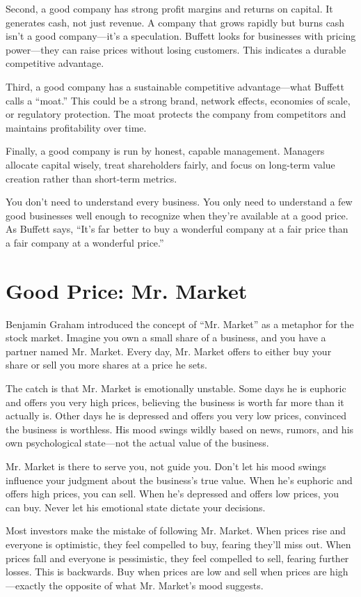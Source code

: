 Second, a good company has strong profit margins and returns on capital. It generates cash, not just revenue. A company that grows rapidly but burns cash isn't a good company—it's a speculation. Buffett looks for businesses with pricing power—they can raise prices without losing customers. This indicates a durable competitive advantage.

Third, a good company has a sustainable competitive advantage—what Buffett calls a ``moat.'' This could be a strong brand, network effects, economies of scale, or regulatory protection. The moat protects the company from competitors and maintains profitability over time.

Finally, a good company is run by honest, capable management. Managers allocate capital wisely, treat shareholders fairly, and focus on long-term value creation rather than short-term metrics.

You don't need to understand every business. You only need to understand a few good businesses well enough to recognize when they're available at a good price. As Buffett says, ``It's far better to buy a wonderful company at a fair price than a fair company at a wonderful price.''

\section*{Good Price: Mr. Market}

Benjamin Graham introduced the concept of ``Mr. Market'' as a metaphor for the stock market. Imagine you own a small share of a business, and you have a partner named Mr. Market. Every day, Mr. Market offers to either buy your share or sell you more shares at a price he sets.

The catch is that Mr. Market is emotionally unstable. Some days he is euphoric and offers you very high prices, believing the business is worth far more than it actually is. Other days he is depressed and offers you very low prices, convinced the business is worthless. His mood swings wildly based on news, rumors, and his own psychological state—not the actual value of the business.

Mr. Market is there to serve you, not guide you. Don't let his mood swings influence your judgment about the business's true value. When he's euphoric and offers high prices, you can sell. When he's depressed and offers low prices, you can buy. Never let his emotional state dictate your decisions.

Most investors make the mistake of following Mr. Market. When prices rise and everyone is optimistic, they feel compelled to buy, fearing they'll miss out. When prices fall and everyone is pessimistic, they feel compelled to sell, fearing further losses. This is backwards. Buy when prices are low and sell when prices are high—exactly the opposite of what Mr. Market's mood suggests.

